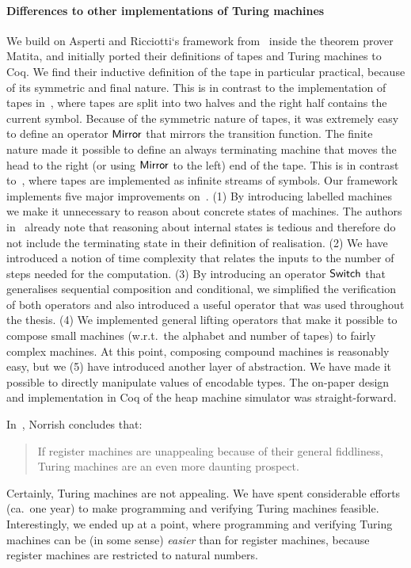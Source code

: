 \paragraph{Differences to other implementations of Turing machines}
We build on Asperti and Ricciotti`s framework from~\cite{asperti2015} inside the theorem prover Matita, and initially ported their definitions of
tapes and Turing machines to Coq.  We find their inductive definition of the tape in particular practical, because of its symmetric and final nature.
This is in contrast to the implementation of tapes in~\cite{xu2013}, where tapes are split into two halves and the right half contains the current
symbol.  Because of the symmetric nature of tapes, it was extremely easy to define an operator $\mathsf{Mirror}$ that mirrors the transition function.
The finite nature made it possible to define an always terminating machine that moves the head to the right (or using $\mathsf{Mirror}$ to the left) end
of the tape.  This is in contrast to~\cite{ciaffaglione2016}, where tapes are implemented as infinite streams of symbols.  Our framework implements
five major improvements on~\cite{asperti2015}.  (1) By introducing labelled machines we make it unnecessary to reason about concrete states of
machines.  The authors in~\cite{asperti2015} already note that reasoning about internal states is tedious and therefore do not include the terminating
state in their definition of realisation.  (2) We have introduced a notion of time complexity that relates the inputs to the number of steps needed
for the computation.  (3) By introducing an operator $\mathsf{Switch}$ that generalises sequential composition and conditional, we simplified the verification
of both operators and also introduced a useful operator that was used throughout the thesis.  (4) We implemented general lifting operators that make
it possible to compose small machines (w.r.t.\ the alphabet and number of tapes) to fairly complex machines.  At this point, composing compound
machines is reasonably easy, but we (5) have introduced another layer of abstraction.  We have made it possible to directly manipulate values of
encodable types.  The on-paper design and implementation in Coq of the heap machine simulator was straight-forward.


In~\cite{norrish2011mechanised}, Norrish concludes that:
\begin{quote}
  If register machines are unappealing because of their general fiddliness, Turing machines are an even more daunting prospect.
\end{quote}
Certainly, Turing machines are not appealing.  We have spent considerable efforts (ca.\ one year) to make programming and verifying Turing machines
feasible.  Interestingly, we ended up at a point, where programming and verifying Turing machines can be (in some sense) \textit{easier} than for
register machines, because register machines are restricted to natural numbers.


